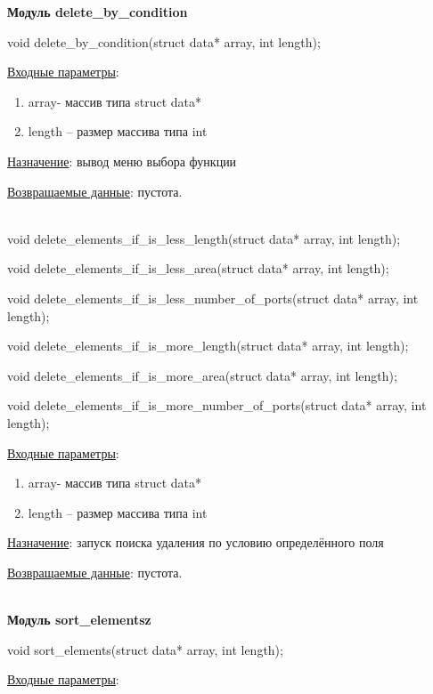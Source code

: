 \textbf{Модуль delete\_by\_condition}

void delete\_by\_condition(struct data* array, int length);

\underline{Входные параметры}:

\begin{enumerate}
    \item array- массив типа struct data*
    \item length – размер массива типа int
\end{enumerate}

\underline{Назначение}: вывод меню выбора функции 

\underline{Возвращаемые данные}: пустота.

\hspace{0pt}\\



void delete\_elements\_if\_is\_less\_length(struct data* array, int length);

void delete\_elements\_if\_is\_less\_area(struct data* array, int length);

void delete\_elements\_if\_is\_less\_number\_of\_ports(struct data* array, int length);

void delete\_elements\_if\_is\_more\_length(struct data* array, int length);

void delete\_elements\_if\_is\_more\_area(struct data* array, int length);

void delete\_elements\_if\_is\_more\_number\_of\_ports(struct data* array, int length);

\underline{Входные параметры}:

\begin{enumerate}
    \item array- массив типа struct data*
    \item length – размер массива типа int
\end{enumerate}

\underline{Назначение}: запуск поиска удаления по условию определённого поля 

\underline{Возвращаемые данные}: пустота.

\hspace{0pt}\\



\textbf{Модуль sort\_elementsz}

void sort\_elements(struct data* array, int length);

\underline{Входные параметры}:

